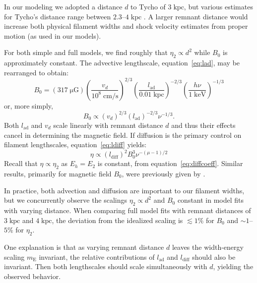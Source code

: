 \documentclass[iop, apj, numberedappendix]{emulateapj}
\newcommand*{\mt}{\mathrm}
\newcommand*{\unit}[1]{\;\mt{#1}}  %
\newcommand*{\abt}{\mathord{\sim}} %
\newcommand*{\mE}{m_\mt{E}}
\newcommand*{\muG}{\unit{\mu G}}
\begin{document}
In our modeling we adopted a distance $d$ to Tycho of $3 \unit{kpc}$, but
various estimates for Tycho's distance range between $2.3$--$4 \unit{kpc}$
\citep{hayato2010}.  A larger remnant distance would increase both physical
filament widths and shock velocity estimates from proper motion (as used in our
models).

For both simple and full models, we find roughly that $\eta_2 \propto d^2$
while $B_0$ is approximately constant.  The advective lengthscale,
equation~\eqref{eq:lad}, may be rearranged to obtain:
\begin{equation}
    B_0 = (317 \muG) \left(\frac{v_d}{10^8 \unit{cm/s}}\right)^{2/3}
                     \left(\frac{l_{\mt{ad}}}{0.01 \unit{kpc}}\right)^{-2/3}
                     \left(\frac{h\nu}{1 \unit{keV}}\right)^{-1/3}
\end{equation}
or, more simply,
\begin{equation}
    B_0 \propto \left(v_d\right)^{2/3}
                \left(l_{\mt{ad}}\right)^{-2/3} \nu^{-1/3} .
\end{equation}
Both $l_{\mt{ad}}$ and $v_d$ scale linearly with remnant distance $d$ and thus
their effects cancel in determining the magnetic field.  If diffusion is the
primary control on filament lengthscales, equation~\eqref{eq:ldiff} yields:
\begin{equation}
    \eta \propto \left(l_{\mt{diff}}\right)^2 B_0^{3} \nu^{-(\mu - 1)/2}
\end{equation}
Recall that $\eta \propto \eta_2$ as $E_h = E_2$ is constant, from
equation~\eqref{eq:diffcoeff}.
Similar results, primarily for magnetic field $B_0$, were previously given by
\citet{parizot2006}.

In practice, both advection and diffusion are important to our filament widths,
but we concurrently observe the scalings $\eta_2 \propto d^2$ and $B_0$
constant in model fits with varying distance.  When comparing full model fits
with remnant distances of $3 \unit{kpc}$ and $4 \unit{kpc}$, the deviation from
the idealized scaling is $\lesssim 1 \%$ for $B_0$ and $\abt 1$--$5\%$ for
$\eta_2$.

One explanation is that as varying remnant distance $d$ leaves the width-energy
scaling $\mE$ invariant, the relative contributions of $l_{\mt{ad}}$ and
$l_{\mt{diff}}$ should also be invariant.  Then both lengthscales should
scale simultaneously with $d$, yielding the observed behavior.
\end{document}
